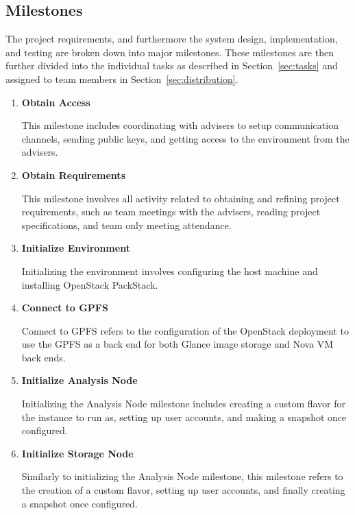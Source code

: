 \subsection{Milestones}
\label{sec:milestones}

The project requirements, and furthermore the system design, 
implementation, and testing are broken down into major milestones. These
milestones are then further divided into the individual tasks as described
in Section~\ref{sec:tasks} and assigned to team members in
Section~\ref{sec:distribution}. 

\begin{enumerate}
  \item \textbf{Obtain Access}

  This milestone includes coordinating with advisers to setup
    communication channels, sending public keys, and getting access to
    the environment from the advisers.

  \item \textbf{Obtain Requirements}

    This milestone involves all activity related to obtaining and
    refining project requirements, such as team meetings with the
    advisers, reading project specifications, and team only meeting
    attendance.

  \item \textbf{Initialize Environment}

    Initializing the environment involves configuring the host machine
    and installing OpenStack PackStack.

  \item \textbf{Connect to GPFS}

    Connect to GPFS refers to the configuration of the OpenStack
    deployment to use the GPFS as a back end for both Glance image
    storage and Nova VM back ends.

  \item \textbf{Initialize Analysis Node}

    Initializing the Analysis Node milestone includes creating a custom
    flavor for the instance to run as, setting up user accounts, and
    making a snapshot once configured.

  \item \textbf{Initialize Storage Node}

    Similarly to initializing the Analysis Node milestone, this
    milestone refers to the creation of a custom flavor, setting up user
    accounts, and finally creating a snapshot once configured.


\end{enumerate}
